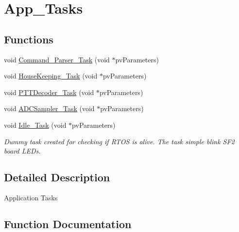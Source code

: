 \hypertarget{group___app___tasks}{}\section{App\+\_\+\+Tasks}
\label{group___app___tasks}
\subsection*{Functions}
\begin{DoxyCompactItemize}
\item 
void \hyperlink{group___app___tasks_gac9a578724e7472c16d1c3192bd544f98}{Command\+\_\+\+Parser\+\_\+\+Task} (void $\ast$pv\+Parameters)
\item 
void \hyperlink{group___app___tasks_gadf0ceb656d8916064e56e3ea4f1dba35}{House\+Keeping\+\_\+\+Task} (void $\ast$pv\+Parameters)
\item 
void \hyperlink{group___app___tasks_gadfbb515047e6c4c679611a5cc618b88c}{P\+T\+T\+Decoder\+\_\+\+Task} (void $\ast$pv\+Parameters)
\item 
void \hyperlink{group___app___tasks_gaccb4dfb0018e43c3697d98f4198bb845}{A\+D\+C\+Sampler\+\_\+\+Task} (void $\ast$pv\+Parameters)
\item 
void \hyperlink{group___app___tasks_ga85a0f311d8c7082245c3308cd9161e46}{Idle\+\_\+\+Task} (void $\ast$pv\+Parameters)
\begin{DoxyCompactList}\small\item\em Dummy task created for checking if R\+T\+OS is alive. The task simple blink S\+F2 board L\+E\+Ds. \end{DoxyCompactList}\end{DoxyCompactItemize}


\subsection{Detailed Description}
Application Tasks 

\subsection{Function Documentation}
\mbox{\label{group___app___tasks_gaccb4dfb0018e43c3697d98f4198bb845}} 
